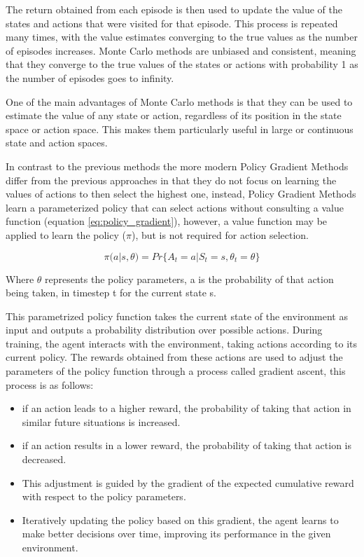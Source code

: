 The return obtained from each episode is then used to update the value of the states and actions that were visited for that episode. This process is repeated many times, with the value estimates converging to the true values as the number of episodes increases. Monte Carlo methods are unbiased and consistent, meaning that they converge to the true values of the states or actions with probability 1 as the number of episodes goes to infinity.

One of the main advantages of Monte Carlo methods is that they can be used to estimate the value of any state or action, regardless of its position in the state space or action space. This makes them particularly useful in large or continuous state and action spaces.

In contrast to the previous methods the more modern Policy Gradient Methods differ from the previous approaches in that they do not focus on learning the values of actions to then select the highest one, instead, Policy Gradient Methods learn a parameterized policy that can select actions without consulting a value function (equation \ref{eq:policy_gradient}), however, a value function may be applied to learn the policy ($\pi$), but is not required for action selection.

\begin{equation}
    \label{eq:policy_gradient}
    \pi(a|s,\theta) = Pr\{A_t=a | S_t=s, \theta_t=\theta\}
\end{equation}

Where $\theta$ represents the policy parameters, a is the probability of that action being taken, in timestep t for the current state s.

This parametrized policy function takes the current state of the environment as input and outputs a probability distribution over possible actions. During training, the agent interacts with the environment, taking actions according to its current policy. The rewards obtained from these actions are used to adjust the parameters of the policy function through a process called gradient ascent, this process is as follows:

\begin{itemize}
    \item if an action leads to a higher reward, the probability of taking that action in similar future situations is increased.
    \item if an action results in a lower reward, the probability of taking that action is decreased.
    \item This adjustment is guided by the gradient of the expected cumulative reward with respect to the policy parameters.
    \item Iteratively updating the policy based on this gradient, the agent learns to make better decisions over time, improving its performance in the given environment.
\end{itemize}


